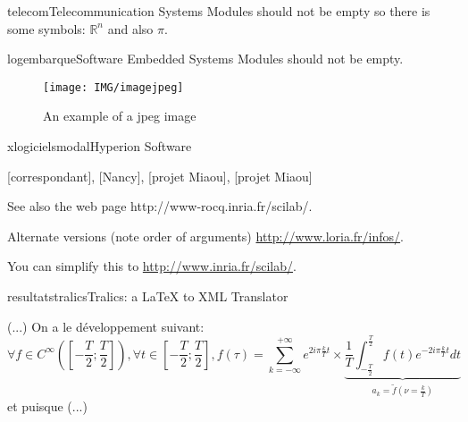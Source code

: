 \documentclass{ra2011}
\begin{document}
\begin{module}{}{telecom}{Telecommunication Systems}
Modules should not be empty so there is  some symbols: $\mathbb{R}^n$ and also $\pi$.
\end{module}

\begin{module}{}{logembarque}{Software Embedded Systems}
Modules should not be empty.

\begin{figure}
\begin{center}
\texttt{[image: IMG/imagejpeg]}
\end{center}
\caption{An example of a jpeg image}
\label{fig:jpegimage}
\end{figure}

\end{module}



\begin{module}{xlogiciels}{modal}{Hyperion Software} 
\begin{participants}
  [correspondant],
  [Nancy],
  [projet Miaou],
  [projet Miaou]
\end{participants}

See also the web page
{http://www-rocq.inria.fr/scilab/}.

Alternate versions (note order of arguments)
\href{http://www.loria.fr/info/}{\url{http://www.loria.fr/infos/}}.

You can simplify this to 
\url{http://www.inria.fr/scilab/}.
\end{module}



\begin{module}{resultats}{tralics}{Tralics: a LaTeX to XML Translator}

(...) On a le développement suivant:
\[ \forall f\in C^\infty\left(\left[-\frac{T}{2};\frac{T}{2}\right]\right),
   \forall t\in \left[-\frac{T}{2};\frac{T}{2}\right],
   f(\tau) = \sum_{k = -\infty}^{+\infty} e^{2i\pi\frac{k}{T}t} \times
   \underbrace{\frac{1}{T}
               \int_{-\frac{T}{2}}^{\frac{T}{2}} f(t) e^{-2i\pi\frac{k}{T}t} dt
              }_{a_k = \tilde{f}\left(\nu = \frac{k}{T}\right)}
\]
et puisque (...)

\end{module}
\end{document}
